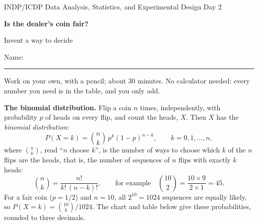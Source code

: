 \documentclass[11pt]{article}
\newif\ifsolutions
\begin{document}
{\small INDP/ICDP Data Analysis, Statistics, and Experimental Design \hfill Day 2}

\medskip
{\LARGE\bfseries Is the dealer's coin fair?}\par
\smallskip
{\large Invent a way to decide}
\ifsolutions\hfill{\large\bfseries\color{c:time}Instructor key}\fi

\medskip
Name: \rule{0.5\textwidth}{0.4pt}

\medskip
Work on your own, with a pencil; about 30 minutes.
No calculator needed: every number you need is in the table, and you only add.

\begin{highlightbox}
\textbf{The binomial distribution.}
Flip a coin $n$ times, independently, with probability $p$ of heads on every flip,
and count the heads, $X$.
Then $X$ has the \emph{binomial distribution}:
\[
  P(X = k) = \binom{n}{k}\, p^k (1-p)^{n-k}, \qquad k = 0, 1, \dots, n,
\]
where $\binom{n}{k}$, read ``$n$ choose $k$'', is the number of ways to choose
which $k$ of the $n$ flips are the heads,
that is, the number of sequences of $n$ flips with exactly $k$ heads:
\[
  \binom{n}{k} = \frac{n!}{k!\,(n-k)!},
  \qquad\text{for example}\quad
  \binom{10}{2} = \frac{10 \times 9}{2 \times 1} = 45.
\]
For a fair coin ($p = 1/2$) and $n = 10$, all $2^{10} = 1024$ sequences are equally likely,
so $P(X = k) = \binom{10}{k} / 1024$.
The chart and table below give these probabilities, rounded to three decimals.
\end{highlightbox}
\end{document}
